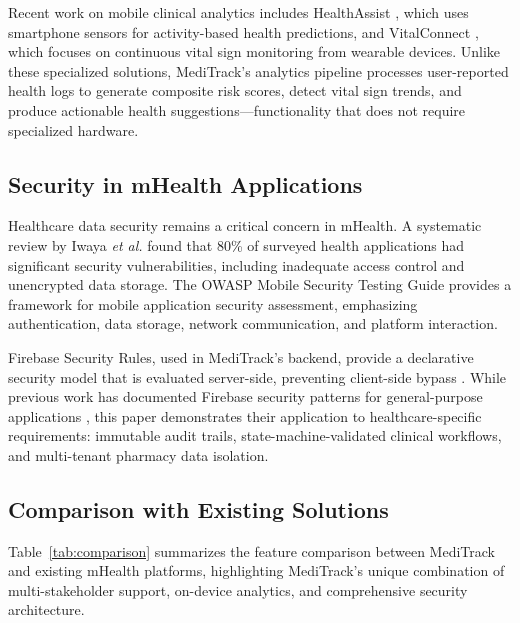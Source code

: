 \documentclass[journal,onecolumn,web]{ieeecolor}
\begin{document}
Recent work on mobile clinical analytics includes
HealthAssist \cite{chen2021}, which uses smartphone
sensors for activity-based health predictions, and
VitalConnect \cite{vitalconnect}, which focuses on
continuous vital sign monitoring from wearable devices.
Unlike these specialized solutions, MediTrack's
analytics pipeline processes user-reported health logs
to generate composite risk scores, detect vital sign
trends, and produce actionable health
suggestions---functionality that does not require
specialized hardware.

\subsection{Security in mHealth Applications}
Healthcare data security remains a critical concern in
mHealth. A systematic review by Iwaya
{\it et al.} \cite{iwaya2020} found that 80\% of
surveyed health applications had significant security
vulnerabilities, including inadequate access control
and unencrypted data storage. The OWASP Mobile Security
Testing Guide \cite{owasp} provides a framework for
mobile application security assessment, emphasizing
authentication, data storage, network communication,
and platform interaction.

Firebase Security Rules, used in MediTrack's backend,
provide a declarative security model that is evaluated
server-side, preventing client-side
bypass \cite{firebase_rules}. While previous work has
documented Firebase security patterns for
general-purpose
applications \cite{sudhodanan2020}, this paper
demonstrates their application to healthcare-specific
requirements: immutable audit trails,
state-machine-validated clinical workflows, and
multi-tenant pharmacy data isolation.

\subsection{Comparison with Existing Solutions}
Table~\ref{tab:comparison} summarizes the feature
comparison between MediTrack and existing mHealth
platforms, highlighting MediTrack's unique combination
of multi-stakeholder support, on-device analytics,
and comprehensive security architecture.
\end{document}
